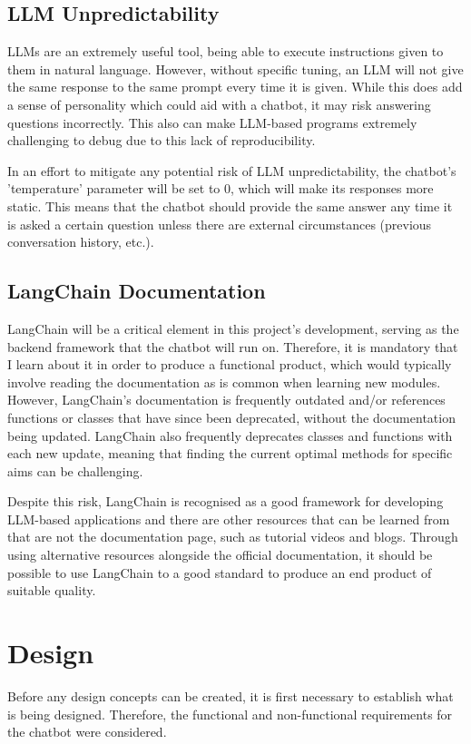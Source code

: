 \subsection{LLM Unpredictability}
LLMs are an extremely useful tool, being able to execute instructions given to them in natural language. However, without specific tuning, 
an LLM will not give the same response to the same prompt every time it is given. While this does add a sense of personality which could 
aid with a chatbot, it may risk answering questions incorrectly. This also can make LLM-based programs extremely challenging to debug due 
to this lack of reproducibility.

\para In an effort to mitigate any potential risk of LLM unpredictability, the chatbot's 'temperature' parameter will be set to 0, 
which will make its responses more static. This means that the chatbot should provide the same answer any time it is asked a certain 
question unless there are external circumstances (previous conversation history, etc.). 

\subsection{LangChain Documentation}
LangChain will be a critical element in this project's development, serving as the backend framework that the chatbot will run on.
Therefore, it is mandatory that I learn about it in order to produce a functional product, which would typically involve reading the 
documentation as is common when learning new modules. However, LangChain's documentation is frequently outdated and/or references 
functions or classes that have since been deprecated, without the documentation being updated. LangChain also frequently deprecates classes 
and functions with each new update, meaning that finding the current optimal methods for specific aims can be challenging.

\para Despite this risk, LangChain is recognised as a good framework for developing LLM-based applications and there are other 
resources that can be learned from that are not the documentation page, such as tutorial videos and blogs. Through using alternative 
resources alongside the official documentation, it should be possible to use LangChain to a good standard to produce an end product 
of suitable quality.

\section{Design}
Before any design concepts can be created, it is first necessary to establish what is being designed. Therefore, the functional and 
non-functional requirements for the chatbot were considered.

